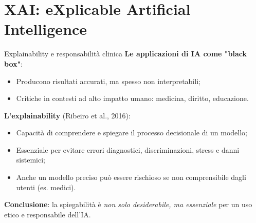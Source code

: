 \documentclass{beamer}
\begin{document}
\section{XAI: eXplicable Artificial Intelligence}
%
%
\begin{frame}{Explainability e responsabilità clinica}
\small
\textbf{Le applicazioni di IA come "black box"}:
\begin{itemize}
    \item Producono risultati accurati, ma spesso non interpretabili;
    \item Critiche in contesti ad alto impatto umano: medicina, diritto, educazione.
\end{itemize}

\vspace{0.2cm}
\textbf{L’explainability} (Ribeiro et al., 2016):
\begin{itemize}
    \item Capacità di comprendere e spiegare il processo decisionale di un modello;
    \item Essenziale per evitare errori diagnostici, discriminazioni, stress e danni sistemici;
    \item Anche un modello preciso può essere rischioso se non comprensibile dagli utenti (es. medici).
\end{itemize}

\vspace{0.2cm}
\textbf{Conclusione}: la spiegabilità è \textit{non solo desiderabile, ma essenziale} per un uso etico e responsabile dell’IA.
\end{frame}
%
%
\end{document}
